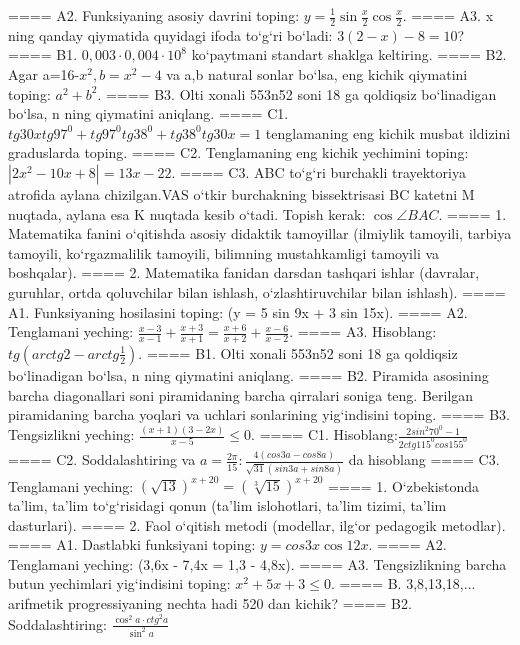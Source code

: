 ====
A2. Funksiyaning asosiy davrini toping: \(y = \frac{1}{2}\sin{\frac{x}{2}\cos\frac{x}{2}}\).
====
A3. x ning qanday qiymatida quyidagi ifoda to‘g‘ri bo‘ladi: \(3 (2 - x) - 8 = 10\)?
====
B1. \(0,003 \cdot 0,004 \cdot 10^{8}\) ko‘paytmani standart shaklga keltiring.
====
B2. Agar a=16-\(x^2, b=x^2-4\) va a,b natural sonlar bo‘lsa, eng kichik qiymatini toping: \(a^2 + b^2\).
====
B3. Olti xonali 553n52 soni 18 ga qoldiqsiz bo‘linadigan bo‘lsa, n ning qiymatini aniqlang.
====
C1. \(tg30xtg97^{0} + tg97^{0}tg38^{0} + tg38^{0}tg30x = 1\) tenglamaning eng kichik musbat ildizini graduslarda toping.
====
C2. Tenglamaning eng kichik yechimini toping: \(\left| 2x^2 - 10x + 8 \right| = 13x - 22\).
====
C3. ABC to‘g‘ri burchakli trayektoriya atrofida aylana chizilgan.VAS o‘tkir burchakning bissektrisasi BC katetni M nuqtada, aylana esa K nuqtada kesib o‘tadi. Topish kerak: \(\cos\angle BAC\).
====
1. Matematika fanini o‘qitishda asosiy didaktik tamoyillar (ilmiylik tamoyili, tarbiya tamoyili, ko‘rgazmalilik tamoyili, bilimning mustahkamligi tamoyili va boshqalar).
====
2. Matematika fanidan darsdan tashqari ishlar (davralar, guruhlar, ortda qoluvchilar bilan ishlash, o‘zlashtiruvchilar bilan ishlash).
====
A1. Funksiyaning hosilasini toping: (y = 5 sin 9x + 3 sin 15x).
====
A2. Tenglamani yeching: \(\frac{x - 3}{x - 1} + \frac{x + 3}{x + 1} = \frac{x + 6}{x + 2} + \frac{x - 6}{x - 2}\).
====
A3. Hisoblang: \(tg\left(arctg2 - arctg\frac{1}{2} \right) \).
====
B1. Olti xonali 553n52 soni 18 ga qoldiqsiz bo‘linadigan bo‘lsa, n ning qiymatini aniqlang.
====
B2. Piramida asosining barcha diagonallari soni piramidaning barcha qirralari soniga teng. Berilgan piramidaning barcha yoqlari va uchlari sonlarining yig‘indisini toping.
====
B3. Tengsizlikni yeching: \(\frac{ (x + 1) (3 - 2x) }{x - 5} \leq 0\).
====
C1. Hisoblang:\(\frac{2sin^{2}70^{0} - 1}{2ctg115^{0}cos155^{0}}\)
====
C2. Soddalashtiring va \(a = \frac{2\pi}{15}:\frac{4 (cos3a - cos8a) }{\sqrt{31} (sin3a + sin8a) }\) da hisoblang
====
C3. Tenglamani yeching: \((\sqrt{13}) ^{x + 20} = (\sqrt[3]{15}) ^{x + 20}\)
====
1. O‘zbekistonda ta’lim, ta’lim to‘g‘risidagi qonun (ta’lim islohotlari, ta’lim tizimi, ta’lim dasturlari).
====
2. Faol o‘qitish metodi (modellar, ilg‘or pedagogik metodlar).
====
A1. Dastlabki funksiyani toping: \(y=cos{3x}\cos{12x}\).
====
A2. Tenglamani yeching: (3,6x - 7,4x = 1,3 - 4,8x).
====
A3. Tengsizlikning barcha butun yechimlari yig‘indisini toping: \(x^2 + 5x + 3 \leq 0\).
====
B. 3,8,13,18,... arifmetik progressiyaning nechta hadi 520 dan kichik?
====
B2. Soddalashtiring: \(\frac{\cos^{2}a \cdot {ctg}^{2}a}{\sin^{2}a}\)

